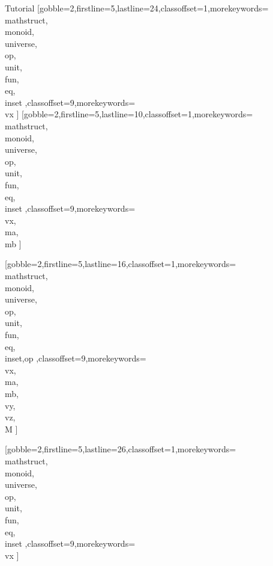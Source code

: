 \documentclass[lang={en,de}]{stex}
\begin{document}
\begin{sfragment}{Tutorial}
    [gobble=2,firstline=5,lastline=24,classoffset=1,morekeywords={
    \\mathstruct,\\monoid,\\universe,\\op,\\unit,\\fun,\\eq,\\inset
    },classoffset=9,morekeywords={
      \\vx
    }]
    [gobble=2,firstline=5,lastline=10,classoffset=1,morekeywords={
    \\mathstruct,\\monoid,\\universe,\\op,\\unit,\\fun,\\eq,\\inset
    },classoffset=9,morekeywords={
      \\vx,\\ma,\\mb
    }]

    [gobble=2,firstline=5,lastline=16,classoffset=1,morekeywords={
    \\mathstruct,\\monoid,\\universe,\\op,\\unit,\\fun,\\eq,\\inset,op
    },classoffset=9,morekeywords={
      \\vx,\\ma,\\mb,\\vy,\\vz,\\M
    }]

    [gobble=2,firstline=5,lastline=26,classoffset=1,morekeywords={
    \\mathstruct,\\monoid,\\universe,\\op,\\unit,\\fun,\\eq,\\inset
    },classoffset=9,morekeywords={
      \\vx
    }]


\end{sfragment}
\end{document}

